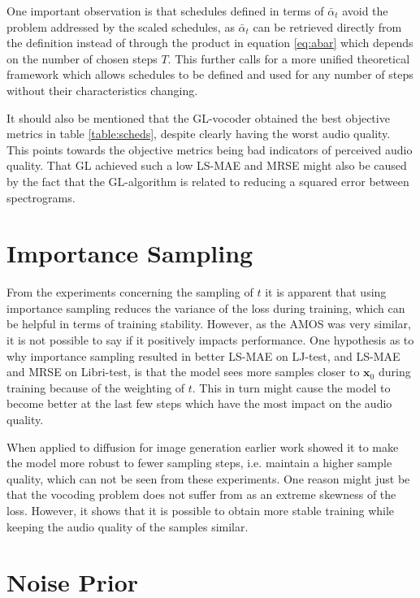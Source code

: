 \documentclass{report}
\begin{document}
One important observation is that schedules defined in terms of $\bar{\alpha}_t$ avoid the problem addressed by the scaled schedules, as $\bar{\alpha}_t$ can be retrieved directly from the definition instead of through the product in equation \ref{eq:abar} which depends on the number of chosen steps $T$. This further calls for a more unified theoretical framework which allows schedules to be defined and used for any number of steps without their characteristics changing.

It should also be mentioned that the GL-vocoder obtained the best objective metrics in table \ref{table:scheds}, despite clearly having the worst audio quality. This points towards the objective metrics being bad indicators of perceived audio quality. That GL achieved such a low LS-MAE and MRSE might also be caused by the fact that the GL-algorithm is related to reducing a squared error between spectrograms.

\section{Importance Sampling}

From the experiments concerning the sampling of $t$ it is apparent that using importance sampling reduces the variance of the loss during training, which can be helpful in terms of training stability. However, as the AMOS was very similar, it is not possible to say if it positively impacts performance. One hypothesis as to why importance sampling resulted in better LS-MAE on LJ-test, and LS-MAE and MRSE on Libri-test, is that the model sees more samples closer to $\bm{x}_0$ during training because of the weighting of $t$. This in turn might cause the model to become better at the last few steps which have the most impact on the audio quality.

When applied to diffusion for image generation earlier work showed it to make the model more robust to fewer sampling steps, i.e. maintain a higher sample quality, which can not be seen from these experiments. One reason might just be that the vocoding problem does not suffer from as an extreme skewness of the loss. However, it shows that it is possible to obtain more stable training while keeping the audio quality of the samples similar.

\section{Noise Prior}
\end{document}
